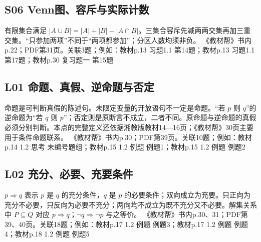 \par\medskip\noindent\begin{minipage}{\linewidth}\subsection{S06 Venn图、容斥与实际计数}
有限集合满足 $|A\cup B|=|A|+|B|-|A\cap B|$。三集合容斥先减两两交集再加三重交集。“只参加两项”不同于“两项都参加”；分区人数均须非负。
{\small 《教材帮》书内p.22；PDF第31页。关联3题；例如：教材p.13 习题1.1 第14题；教材p.13 习题1.1 第17题；教材p.30 复习题一 第15题}\par\end{minipage}\par
\par\medskip\noindent\begin{minipage}{\linewidth}\subsection{L01 命题、真假、逆命题与否定}
命题是可判断真假的陈述句。未限定变量的开放语句不一定是命题。“若 $p$ 则 $q$”的逆命题为“若 $q$ 则 $p$”；否定则是原断言不成立，二者不同。原命题与逆命题的真假必须分别判断。本点的完整定义还依据湘教版教材14—16页；《教材帮》30页主要用于条件命题联系。
{\small 《教材帮》书内p.30；PDF第39页。关联10题；例如：教材p.14 1.2 思考 未编号题组；教材p.15 1.2 例题 例题1；教材p.15 1.2 例题 例题2}\par\end{minipage}\par
\par\medskip\noindent\begin{minipage}{\linewidth}\subsection{L02 充分、必要、充要条件}
$p\Rightarrow q$ 表示 $p$ 是 $q$ 的充分条件，$q$ 是 $p$ 的必要条件；双向成立为充要。只正向为充分不必要，只反向为必要不充分；两向均不成立为既不充分又不必要。解集关系中 $P\subseteq Q$ 对应 $p\Rightarrow q$；$\neg q\Rightarrow\neg p$ 与之等价。
{\small 《教材帮》书内p.30、31；PDF第39、40页。关联18题；例如：教材p.17 1.2 例题 例题3；教材p.17 1.2 例题 例题4；教材p.18 1.2 例题 例题5}\par\end{minipage}\par
